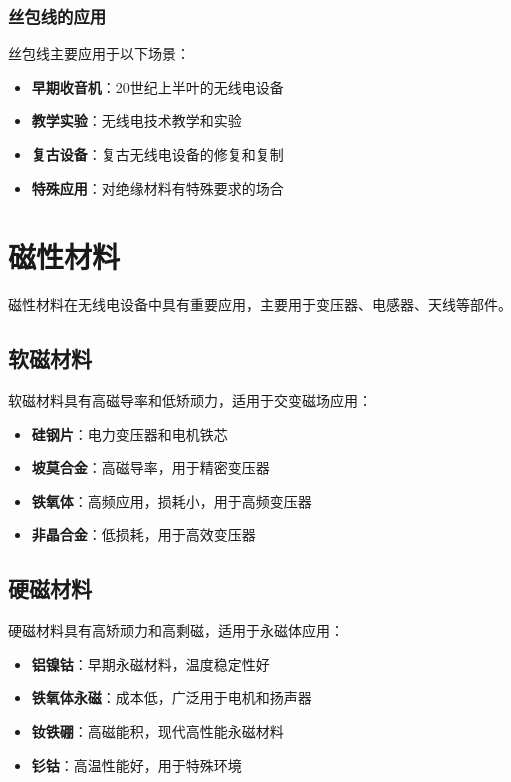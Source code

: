 \documentclass[12pt,UTF8]{ctexbook}
\begin{document}
\subsection{丝包线的应用}

丝包线主要应用于以下场景：

\begin{itemize}[leftmargin=3.5em]
    \item \textbf{早期收音机}：20世纪上半叶的无线电设备
    \item \textbf{教学实验}：无线电技术教学和实验
    \item \textbf{复古设备}：复古无线电设备的修复和复制
    \item \textbf{特殊应用}：对绝缘材料有特殊要求的场合
\end{itemize}

\chapter{磁性材料}

磁性材料在无线电设备中具有重要应用，主要用于变压器、电感器、天线等部件。

\section{软磁材料}

软磁材料具有高磁导率和低矫顽力，适用于交变磁场应用：

\begin{itemize}[leftmargin=3.5em]
    \item \textbf{硅钢片}：电力变压器和电机铁芯
    \item \textbf{坡莫合金}：高磁导率，用于精密变压器
    \item \textbf{铁氧体}：高频应用，损耗小，用于高频变压器
    \item \textbf{非晶合金}：低损耗，用于高效变压器
\end{itemize}

\section{硬磁材料}

硬磁材料具有高矫顽力和高剩磁，适用于永磁体应用：

\begin{itemize}[leftmargin=3.5em]
    \item \textbf{铝镍钴}：早期永磁材料，温度稳定性好
    \item \textbf{铁氧体永磁}：成本低，广泛用于电机和扬声器
    \item \textbf{钕铁硼}：高磁能积，现代高性能永磁材料
    \item \textbf{钐钴}：高温性能好，用于特殊环境
\end{itemize}
\end{document}
